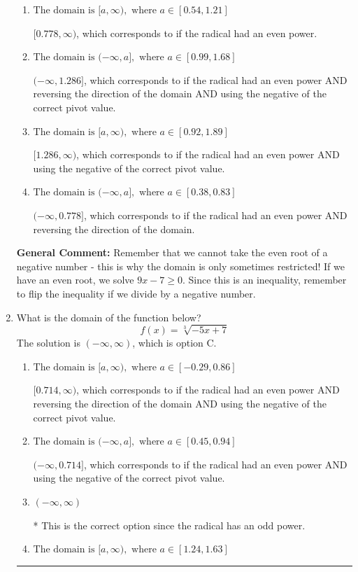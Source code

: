 \documentclass{extbook}[14pt]
\newcommand{\litem}[1]{\item #1

\rule{\textwidth}{0.4pt}}
\begin{document}
\begin{enumerate}
{\begin{enumerate}[label=\Alph*.]
* This is the correct option since the radical has an odd power.
\item \( \text{The domain is } [a, \infty), \text{   where } a \in [0.54, 1.21] \)

$[0.778, \infty)$, which corresponds to if the radical had an even power.
\item \( \text{The domain is } (-\infty, a], \text{   where } a \in [0.99, 1.68] \)

$(-\infty, 1.286]$, which corresponds to if the radical had an even power AND reversing the direction of the domain AND using the negative of the correct pivot value.
\item \( \text{The domain is } [a, \infty), \text{   where } a \in [0.92, 1.89] \)

$[1.286, \infty)$, which corresponds to if the radical had an even power AND using the negative of the correct pivot value.
\item \( \text{The domain is } (-\infty, a], \text{   where } a \in [0.38, 0.83] \)

$(-\infty, 0.778]$, which corresponds to if the radical had an even power AND reversing the direction of the domain.
\end{enumerate}

\textbf{General Comment:} Remember that we cannot take the even root of a negative number - this is why the domain is only sometimes restricted! If we have an even root, we solve $9 x - 7 \geq 0$. Since this is an inequality, remember to flip the inequality if we divide by a negative number.
}
\litem{
What is the domain of the function below?
\[ f(x) = \sqrt[3]{-5 x + 7} \]
The solution is \( (-\infty, \infty) \), which is option C.\begin{enumerate}[label=\Alph*.]
\item \( \text{The domain is } [a, \infty), \text{   where } a \in [-0.29, 0.86] \)

$[0.714, \infty)$, which corresponds to if the radical had an even power AND reversing the direction of the domain AND using the negative of the correct pivot value.
\item \( \text{The domain is } (-\infty, a], \text{   where } a \in [0.45, 0.94] \)

$(-\infty, 0.714]$, which corresponds to if the radical had an even power AND using the negative of the correct pivot value.
\item \( (-\infty, \infty) \)

* This is the correct option since the radical has an odd power.
\item \( \text{The domain is } [a, \infty), \text{   where } a \in [1.24, 1.63] \)


\end{enumerate}}
\end{enumerate}
\end{document}
